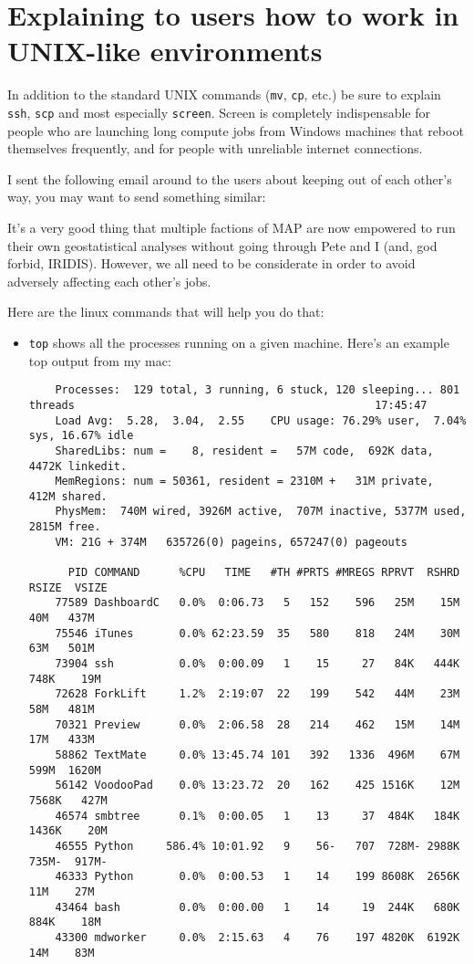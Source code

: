 \section{Explaining to users how to work in UNIX-like environments}

In addition to the standard UNIX commands (\texttt{mv}, \texttt{cp}, etc.) be sure to explain \texttt{ssh}, \texttt{scp} and most especially \texttt{screen}. Screen is completely indispensable for people who are launching long compute jobs from Windows machines that reboot themselves frequently, and for people with unreliable internet connections.

I sent the following email around to the users about keeping out of each other's way, you may want to send something similar:

\bigskip
{\sffamily

It's a very good thing that multiple factions of MAP are now empowered to run their own geostatistical analyses without going through Pete and I (and, god forbid, IRIDIS). However, we all need to be considerate in order to avoid adversely affecting each other's jobs.


Here are the linux commands that will help you do that:

\begin{itemize}
    \item \texttt{top} shows all the processes running on a given machine. Here's an example top output from my mac:

    \begin{verbatim}
    Processes:  129 total, 3 running, 6 stuck, 120 sleeping... 801 threads                                              17:45:47
    Load Avg:  5.28,  3.04,  2.55    CPU usage: 76.29% user,  7.04% sys, 16.67% idle
    SharedLibs: num =    8, resident =   57M code,  692K data, 4472K linkedit.
    MemRegions: num = 50361, resident = 2310M +   31M private,  412M shared.
    PhysMem:  740M wired, 3926M active,  707M inactive, 5377M used, 2815M free.
    VM: 21G + 374M   635726(0) pageins, 657247(0) pageouts

      PID COMMAND      %CPU   TIME   #TH #PRTS #MREGS RPRVT  RSHRD  RSIZE  VSIZE
    77589 DashboardC   0.0%  0:06.73   5   152    596   25M    15M    40M   437M 
    75546 iTunes       0.0% 62:23.59  35   580    818   24M    30M    63M   501M 
    73904 ssh          0.0%  0:00.09   1    15     27   84K   444K   748K    19M 
    72628 ForkLift     1.2%  2:19:07  22   199    542   44M    23M    58M   481M 
    70321 Preview      0.0%  2:06.58  28   214    462   15M    14M    17M   433M 
    58862 TextMate     0.0% 13:45.74 101   392   1336  496M    67M   599M  1620M 
    56142 VoodooPad    0.0% 13:23.72  20   162    425 1516K    12M  7568K   427M 
    46574 smbtree      0.1%  0:00.05   1    13     37  484K   184K  1436K    20M 
    46555 Python     586.4% 10:01.92   9    56-   707  728M- 2988K   735M-  917M-
    46333 Python       0.0%  0:00.53   1    14    199 8608K  2656K    11M    27M 
    43464 bash         0.0%  0:00.00   1    14     19  244K   680K   884K    18M 
    43300 mdworker     0.0%  2:15.63   4    76    197 4820K  6192K    14M    83M     
    \end{verbatim}


\end{itemize}}
